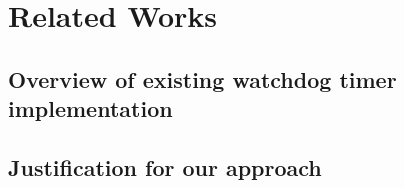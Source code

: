 
\chapter{Related Works}
\label{chap:related_work}

\section{Overview of existing watchdog timer implementation}

\section{Justification for our approach}